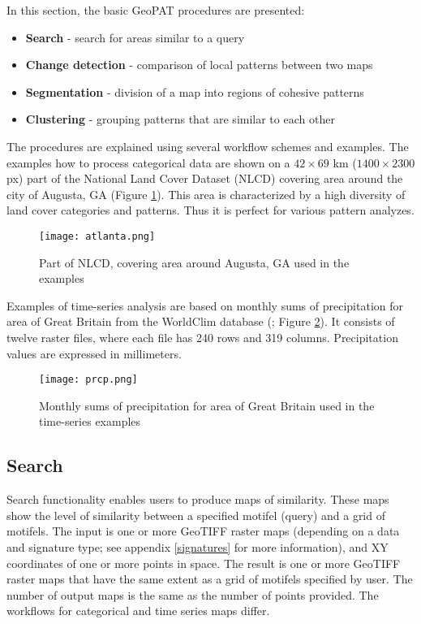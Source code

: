 In this section, the basic GeoPAT procedures are presented: 

\begin{itemize}
	\item {\bf Search} - search for areas similar to a query
	\item {\bf Change detection} - comparison of local patterns between two maps
	\item {\bf Segmentation} - division of a map into regions of cohesive patterns
	\item {\bf Clustering} - grouping patterns that are similar to each other
\end{itemize}

The procedures are explained using several workflow schemes and examples.
The examples how to process categorical data are shown on a $42\times 69$ km ($1400\times 2300$ px) part of the National Land Cover Dataset (NLCD) covering area around the city of Augusta, GA (Figure \ref{FIG:AUGUSTA}).
This area is characterized by a high diversity of land cover categories and patterns.
Thus it is perfect for various pattern analyzes.

\begin{figure}[H]
	\centering
	\texttt{[image: atlanta.png]}
	\caption{Part of NLCD, covering area around Augusta, GA used in the examples}
	\label{FIG:AUGUSTA}
\end{figure}

Examples of time-series analysis are based on monthly sums of precipitation for area of Great Britain from the WorldClim database (\cite{hijmans2005very}; Figure \ref{FIG:PRCP}).
It consists of twelve raster files, where each file has 240 rows and 319 columns.
Precipitation values are expressed in millimeters.

\begin{figure}[H]
	\centering
	\texttt{[image: prcp.png]}
	\caption{Monthly sums of precipitation for area of Great Britain used in the time-series examples}
	\label{FIG:PRCP}
\end{figure}

\FloatBarrier

\subsection{Search}

Search functionality enables users to produce maps of similarity. 
These maps show the level of similarity between a specified motifel (query) and a grid of motifels.
The input is one or more GeoTIFF raster maps (depending on a data and signature type; see appendix \ref{signatures} for more information), and XY coordinates of one or more points in space.
The result is one or more GeoTIFF raster maps that have the same extent as a grid of motifels specified by user.
The number of output maps is the same as the number of points provided.
The workflows for categorical and time series maps differ.

